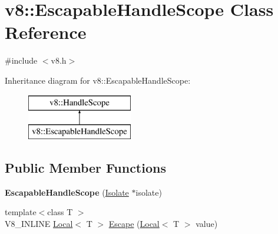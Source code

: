 \hypertarget{classv8_1_1_escapable_handle_scope}{}\section{v8\+:\+:Escapable\+Handle\+Scope Class Reference}
\label{classv8_1_1_escapable_handle_scope}


{\ttfamily \#include $<$v8.\+h$>$}

Inheritance diagram for v8\+:\+:Escapable\+Handle\+Scope\+:\begin{figure}[H]
\begin{center}
\leavevmode
\includegraphics[height=2.000000cm]{classv8_1_1_escapable_handle_scope}
\end{center}
\end{figure}
\subsection*{Public Member Functions}
\begin{DoxyCompactItemize}
\item 
{\bfseries Escapable\+Handle\+Scope} (\hyperlink{classv8_1_1_isolate}{Isolate} $\ast$isolate)\hypertarget{classv8_1_1_escapable_handle_scope_aea39a7fd4dee6da31f3921ff891e1731}{}\label{classv8_1_1_escapable_handle_scope_aea39a7fd4dee6da31f3921ff891e1731}

\item 
{\footnotesize template$<$class T $>$ }\\V8\+\_\+\+I\+N\+L\+I\+NE \hyperlink{classv8_1_1_local}{Local}$<$ T $>$ \hyperlink{classv8_1_1_escapable_handle_scope_afdf0d3850978f65d1a827f78b3a2b6fd}{Escape} (\hyperlink{classv8_1_1_local}{Local}$<$ T $>$ value)
\end{DoxyCompactItemize}
